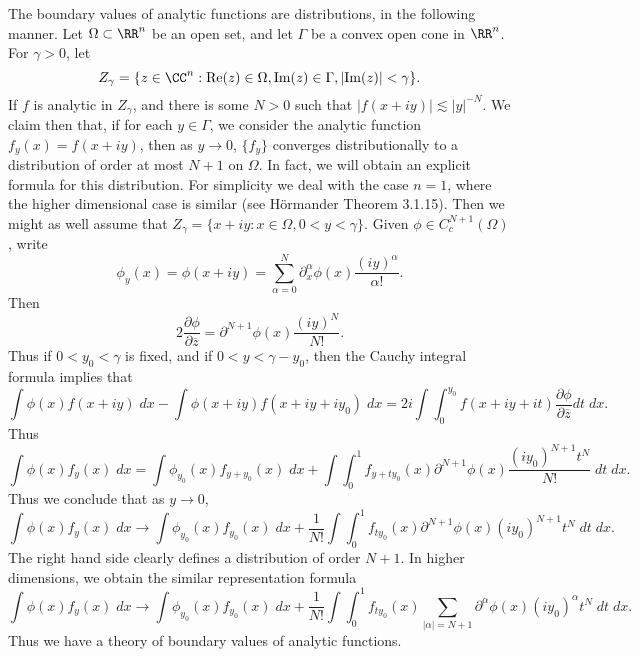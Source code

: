 \begin{example}
    The boundary values of analytic functions are distributions, in the following manner. Let $\Omega \subset \RR^n$ be an open set, and let $\Gamma$ be a convex open cone in $\RR^n$. For $\gamma > 0$, let
    \[ Z_\gamma = \{ z \in \CC^n: \text{Re}(z) \in \Omega, \text{Im}(z) \in \Gamma, |\text{Im}(z)| < \gamma \}. \]
    If $f$ is analytic in $Z_\gamma$, and there is some $N > 0$ such that $|f(x + iy)| \lesssim |y|^{-N}$. We claim then that, if for each $y \in \Gamma$, we consider the analytic function $f_y(x) = f(x + iy)$, then as $y \to 0$, $\{ f_y \}$ converges distributionally to a distribution of order at most $N+1$ on $\Omega$. In fact, we will obtain an explicit formula for this distribution. For simplicity we deal with the case $n = 1$, where the higher dimensional case is similar (see H\"{o}rmander Theorem 3.1.15). Then we might as well assume that $Z_\gamma = \{ x + i y : x \in \Omega, 0 < y < \gamma \}$. Given $\phi \in C_c^{N+1}(\Omega)$, write
    \[ \phi_y(x) = \phi(x + i y) = \sum_{\alpha = 0}^N \partial^\alpha_x \phi(x) \frac{(i y)^\alpha}{\alpha!}. \]
    Then
    \[ 2 \frac{\partial \phi}{\partial \overline{z}} = \partial^{N+1} \phi(x) \frac{(iy)^N}{N!}. \]
    Thus if $0 < y_0 < \gamma$ is fixed, and if $0 < y < \gamma - y_0$, then the Cauchy integral formula implies that
    \[ \int \phi(x) f(x + iy)\; dx - \int \phi(x + iy) f(x + iy + iy_0)\; dx = 2i \int \int_0^{y_0} f(x + iy + it) \frac{\partial \phi}{\partial \overline{z}} dt\; dx. \]
    Thus
    \[ \int \phi(x) f_y(x)\; dx = \int \phi_{y_0}(x) f_{y + y_0}(x)\; dx + \int \int_0^1 f_{y + ty_0}(x) \partial^{N+1} \phi(x) \frac{(i y_0)^{N+1} t^N}{N!}\; dt\; dx. \]
    Thus we conclude that as $y \to 0$,
    \[ \int \phi(x) f_y(x)\; dx \to \int \phi_{y_0}(x) f_{y_0}(x)\; dx + \frac{1}{N!} \int \int_0^1 f_{ty_0}(x) \partial^{N+1} \phi(x) (i y_0)^{N+1} t^N\; dt\; dx. \]
    The right hand side clearly defines a distribution of order $N+1$. In higher dimensions, we obtain the similar representation formula
    \[ \int \phi(x) f_y(x)\; dx \to \int \phi_{y_0}(x) f_{y_0}(x)\; dx + \frac{1}{N!} \int \int_0^1 f_{ty_0}(x) \sum_{|\alpha| = N+1} \partial^\alpha \phi(x) (iy_0)^\alpha t^N\; dt\; dx. \]
    Thus we have a theory of boundary values of analytic functions.


\end{example}
